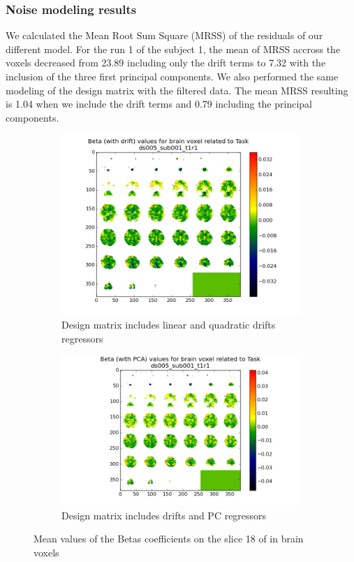 \subsubsection{Noise modeling results}
\noindent
\par We calculated the Mean Root Sum Square (MRSS) of the residuals of our different model.
For the run 1 of the subject 1, the mean of MRSS accross the voxels decreased from 23.89 
including only the drift terms to 7.32 with the inclusion of the three first principal 
components. We also performed the same modeling of the design matrix with the filtered data.
The mean MRSS resulting is 1.04 when we include the drift terms and 0.79 including the 
principal components.

\begin{figure}[H]
\begin{subfigure}{.45\textwidth}
    \centering
    \includegraphics[width=.9\linewidth]{../fig/mosaic/ds005_sub001_t1r1_withdrift_Task.png}
    \caption{Design matrix includes linear and quadratic drifts regressors}
    \label{fig:betas1}
\end{subfigure}%
\begin{subfigure}{.5\textwidth}
    \centering
    \includegraphics[width=.9\linewidth]{../fig/mosaic/ds005_sub001_t1r1_withPCA_Task.png}
    \caption{Design matrix includes drifts and PC regressors}
    \label{fig:betas2}
\end{subfigure}
\caption{Mean values of the Betas coefficients on the slice 18 of in brain voxels}
\label{fig:betas}
\end{figure}

